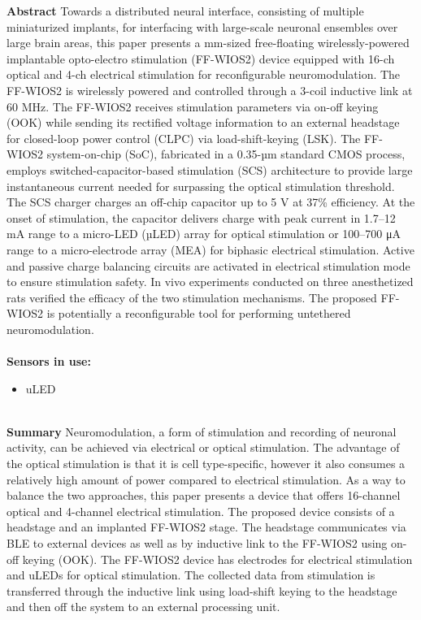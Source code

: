 \noindent
\textbf{Abstract} Towards a distributed neural interface, consisting of multiple miniaturized implants, for interfacing with large-scale neuronal ensembles over large brain areas, this paper presents a mm-sized free-floating wirelessly-powered implantable opto-electro stimulation (FF-WIOS2) device equipped with 16-ch optical and 4-ch electrical stimulation for reconfigurable neuromodulation. The FF-WIOS2 is wirelessly powered and controlled through a 3-coil inductive link at 60 MHz. The FF-WIOS2 receives stimulation parameters via on-off keying (OOK) while sending its rectified voltage information to an external headstage for closed-loop power control (CLPC) via load-shift-keying (LSK). The FF-WIOS2 system-on-chip (SoC), fabricated in a 0.35-µm standard CMOS process, employs switched-capacitor-based stimulation (SCS) architecture to provide large instantaneous current needed for surpassing the optical stimulation threshold. The SCS charger charges an off-chip capacitor up to 5 V at 37\% efficiency. At the onset of stimulation, the capacitor delivers charge with peak current in 1.7–12 mA range to a micro-LED (µLED) array for optical stimulation or 100–700 μA range to a micro-electrode array (MEA) for biphasic electrical stimulation. Active and passive charge balancing circuits are activated in electrical stimulation mode to ensure stimulation safety. In vivo experiments conducted on three anesthetized rats verified the efficacy of the two stimulation mechanisms. The proposed FF-WIOS2 is potentially a reconfigurable tool for performing untethered neuromodulation. \\ \\

\noindent
\textbf{Sensors in use:}
\begin{itemize}
    \item uLED \\ \\
\end{itemize}

\noindent
\textbf{Summary} Neuromodulation, a form of stimulation and recording of neuronal activity, can be achieved via electrical or optical stimulation. The advantage of the optical stimulation is that it is cell type-specific, however it also consumes a relatively high amount of power compared to electrical stimulation. As a way to balance the two approaches, this paper presents a device that offers 16-channel optical and 4-channel electrical stimulation. The proposed device consists of a headstage and an implanted FF-WIOS2 stage. The headstage communicates via BLE to external devices as well as by inductive link to the FF-WIOS2 using on-off keying (OOK). The FF-WIOS2 device has electrodes for electrical stimulation and uLEDs for optical stimulation. The collected data from stimulation is transferred through the inductive link using load-shift keying to the headstage and then off the system to an external processing unit. \\ \\

